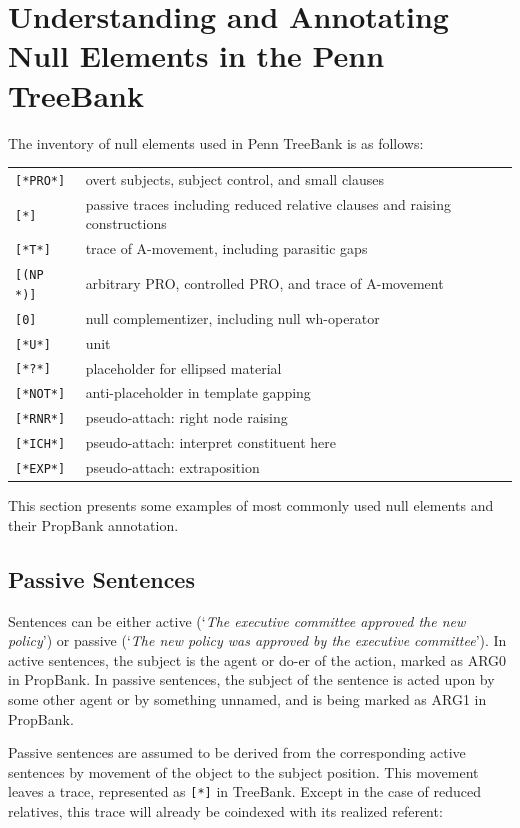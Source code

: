 \documentclass[11pt]{report}
\begin{document}
\section{Understanding and Annotating Null Elements in the Penn TreeBank}
\label{sec: null1}
The inventory of null elements used in Penn TreeBank is as follows: 

\begin{tabular}{ll}
	\texttt{[*PRO*]} & overt subjects, subject control, and small clauses \\ \relax
	\texttt{[*]} & passive traces including reduced relative clauses and raising constructions \\ \relax
	\texttt{[*T*]} & trace of A-movement, including parasitic gaps \\ \relax
	\texttt{[(NP *)]} & arbitrary PRO, controlled PRO, and trace of A-movement  \\ \relax
	\texttt{[0]} & null complementizer, including null wh-operator \\ \relax
	\texttt{[*U*]} & unit \\ \relax
	\texttt{[*?*]} & placeholder for ellipsed material \\ \relax
	\texttt{[*NOT*]} & anti-placeholder in template gapping \\ \relax
	\texttt{[*RNR*]} & pseudo-attach: right node raising \\ \relax
	\texttt{[*ICH*]} & pseudo-attach: interpret constituent here \\ \relax
	\texttt{[*EXP*]} & pseudo-attach: extraposition \\
\end{tabular}

This section presents some examples of most commonly used null elements and their PropBank annotation.

\subsection{Passive Sentences} 

Sentences can be either active (`\textit{The executive committee approved the new policy}') or passive (`\textit{The new policy was approved by the executive committee}'). In active sentences, the subject is the agent or do-er of the action, marked as ARG0 in PropBank. In passive sentences, the subject of the sentence is acted upon by some other agent or by something unnamed, and is being marked as ARG1 in PropBank. 

Passive sentences are assumed to be derived from the corresponding active sentences by movement of the object to the subject position. This movement leaves a trace, represented as \texttt{[*]} in TreeBank.  Except in the case of reduced relatives, this trace will already be coindexed with its realized referent: 
                        
\end{document}
